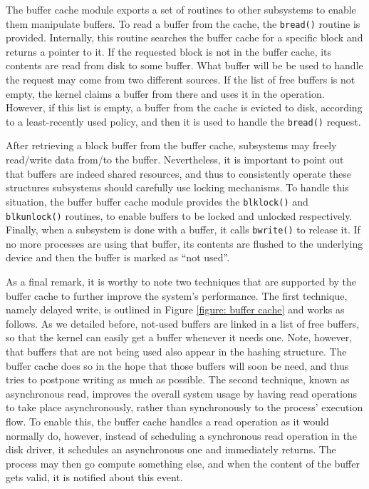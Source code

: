 	The buffer cache module exports a set of routines to other
	subsystems to enable them manipulate buffers. To read a buffer from
	the cache, the \texttt{bread()} routine is provided. Internally,
	this routine searches the buffer cache for a specific block and
	returns a pointer to it. If the requested block is not in the buffer
	cache, its contents are read from disk to some buffer. What buffer
	will be be used to handle the request may come from two different
	sources. If the list of free buffers is not empty, the kernel claims
	a buffer from there and uses it in the operation. However, if this
	list is empty, a buffer from the cache is evicted to disk, according
	to a least-recently used policy, and then it is used to handle the
	\texttt{bread()} request.

	After retrieving a block buffer from the buffer cache, subsystems
	may freely read/write data from/to the buffer. Nevertheless, it is
	important to point out that buffers are indeed shared resources, and
	thus to consistently operate these structures subsystems should
	carefully use locking mechanisms. To handle this situation, the
	buffer  buffer cache module provides the \texttt{blklock()} and
	\texttt{blkunlock()} routines, to enable buffers to be locked and
	unlocked respectively. Finally, when a subsystem is done with a
	buffer, it calls \texttt{bwrite()} to release it. If no more
	processes are using that buffer, its contents are flushed to the
	underlying device and then the buffer is marked as ``not used''.

	As a final remark, it is worthy to note two techniques that are
	supported by the buffer cache to further improve the system's
	performance. The first technique, namely delayed write, is outlined
	in Figure \ref{figure: buffer cache} and works as follows. As we
	detailed before, not-used buffers are linked in a list of free
	buffers, so that the kernel can easily get a buffer whenever it
	needs one. Note, however, that buffers that are not being used also
	appear in the hashing structure. The buffer cache does so in the
	hope that those buffers will soon be need, and thus tries to
	postpone writing as much as possible. The second technique, known as
	asynchronous read, improves the overall system usage by having read
	operations to take place asynchronously, rather than synchronously
	to the process' execution flow. To enable this, the buffer cache
	handles a read operation as it would normally do, however, instead
	of scheduling a synchronous read operation in the disk driver, it
	schedules an asynchronous one and immediately returns. The process
	may then go compute something else, and when the content of the
	buffer gets valid, it is notified about this event.

